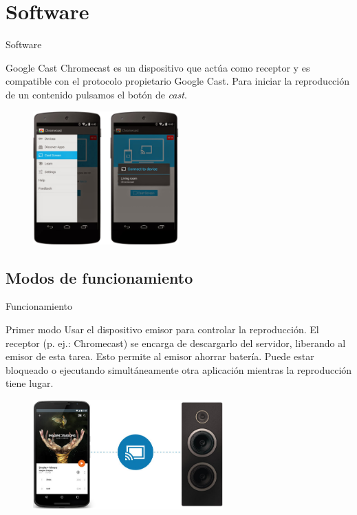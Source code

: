 \section{Software}

\begin{frame}{Software}
	\begin{block}{Google Cast}
		Chromecast es un dispositivo que actúa como receptor y es compatible con el protocolo propietario Google Cast.
		Para iniciar la reproducción de un contenido pulsamos el botón de \textit{cast}.
	\end{block}

	\begin{figure}[h]
		\centering
		\includegraphics[width=0.5\textwidth]{./Imagenes/chromecast-mirroring.jpg}
	\end{figure}
\end{frame}



\subsection{Modos de funcionamiento}

\begin{frame}{Funcionamiento}
	\begin{block}{Primer modo}
		Usar el dispositivo emisor para controlar la reproducción. El receptor (p. ej.: Chromecast) se encarga de descargarlo del servidor, liberando al emisor de esta tarea.
		Esto permite al emisor ahorrar batería. Puede estar bloqueado o ejecutando simultáneamente otra aplicación mientras la reproducción tiene lugar.
	\end{block}

	\begin{figure}[h]
		\includegraphics[width=0.65\textwidth]{./Imagenes/cast-speaker.jpg}
	\end{figure}
\end{frame}


